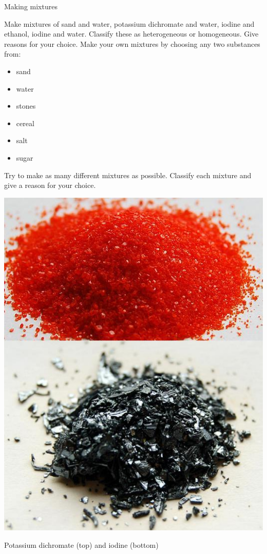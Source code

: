\begin{activity}{Making mixtures}
\nopagebreak
{

Make mixtures of sand and water, potassium dichromate and water, iodine and ethanol, iodine and water. Classify these as heterogeneous or homogeneous. Give reasons for your choice. Make your own mixtures by choosing any two substances from:\\
\begin{minipage}{0.6\textwidth}
\begin{itemize}[noitemsep] 
\item sand 
\item water 
\item stones 
\item cereal 
\item salt 
\item sugar 
\end{itemize} 
Try to make as many different mixtures as possible. Classify each mixture and give a reason for your choice.
                                                                                                                                                                                                                                                                                                                                                                                                                      
\end{minipage}
\begin{minipage}{.4\textwidth}
{
\begin{center}
 \includegraphics[width=.7\textwidth]{photos/iodine-KCr2O7-wikipedia.jpg}\par
\begin{caption}Potassium dichromate (top) and iodine (bottom)\end{caption}
\end{center}
}

\end{minipage}
}
\end{activity}
